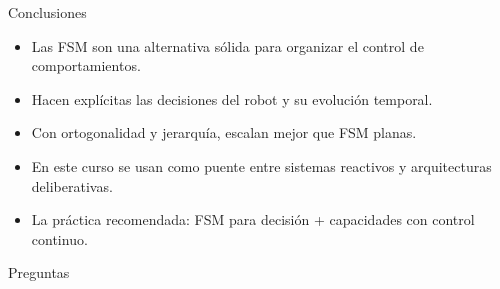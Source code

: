 \documentclass[aspectratio=169]{beamer}
\begin{document}
\begin{frame}{Conclusiones}
\small
\begin{itemize}
  \item Las FSM son una alternativa sólida para organizar el control de comportamientos.
  \item Hacen explícitas las decisiones del robot y su evolución temporal.
  \item Con ortogonalidad y jerarquía, escalan mejor que FSM planas.
  \item En este curso se usan como puente entre sistemas reactivos y arquitecturas deliberativas.
  \item La práctica recomendada: FSM para decisión + capacidades con control continuo.
\end{itemize}
\end{frame}

\begin{frame}
  \centering
  \Large Preguntas
\end{frame}
\end{document}
